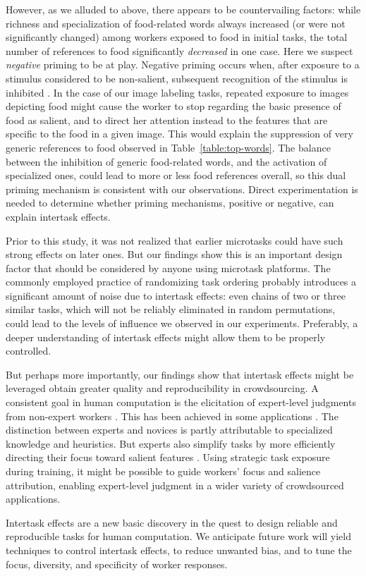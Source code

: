 \documentclass{sigchi}
\begin{document}
However, as we alluded to above, there appears to be countervailing 
factors:
while richness and specialization of food-related words always increased 
(or were not significantly changed) among workers exposed to food in 
initial tasks, the total number of references to food significantly 
\textit{decreased} in one case.  
Here we suspect \textit{negative} priming to be at play.
Negative priming occurs when, after exposure to a stimulus 
considered to be non-salient, subsequent recognition of the stimulus is 
inhibited \cite{mayr2007negative}.  In the case of our image labeling 
tasks, repeated exposure to images depicting food might cause the worker to
stop regarding the basic presence of food as salient, and to direct her 
attention instead to the features that are specific to the food in a given 
image.  This would explain the suppression of very generic references to 
food observed in Table~\ref{table:top-words}.  
The balance between the inhibition of generic food-related words, and the 
activation of specialized ones, could lead to more or less food references
overall, so this dual priming mechanism is consistent with our 
observations.  Direct experimentation is needed to determine whether
priming mechanisms, positive or negative, can explain intertask
effects.

Prior to this study, it was not realized that earlier microtasks could 
have such strong effects on later ones.
But our findings show this is an important design factor that 
should be considered by anyone using microtask platforms.
The commonly employed practice of randomizing task ordering probably
introduces a significant amount of noise due to intertask effects:
even chains of two or three similar tasks, which will not be reliably 
eliminated in random permutations, could lead to the levels of influence 
we observed in our experiments.  Preferably, a deeper understanding of 
intertask effects might allow them to be properly controlled.

But perhaps more importantly, our findings show that intertask effects 
might be leveraged obtain greater quality and reproducibility in 
crowdsourcing.
A consistent goal in human computation is the elicitation of expert-level
judgments from non-expert workers \cite{kittur2011crowdforge}.  
This has been achieved in some
applications \cite{snow2008cheap,Mortensen20131020,Warby2014385}. 
The distinction between experts and novices is partly attributable
to specialized knowledge and heuristics. 
But experts also simplify tasks by more efficiently directing 
their focus toward salient features \cite{kellman2009perceptual}.  
Using strategic task exposure during training, it might be possible to 
guide workers' focus and salience attribution, enabling expert-level 
judgment in a wider variety of crowdsourced applications.

Intertask effects are a new basic discovery in the quest to design 
reliable and reproducible tasks for human computation.
We anticipate future work will yield techniques to control intertask 
effects, to reduce unwanted bias, and to tune the focus, diversity, and 
specificity of worker responses.



\end{document}
